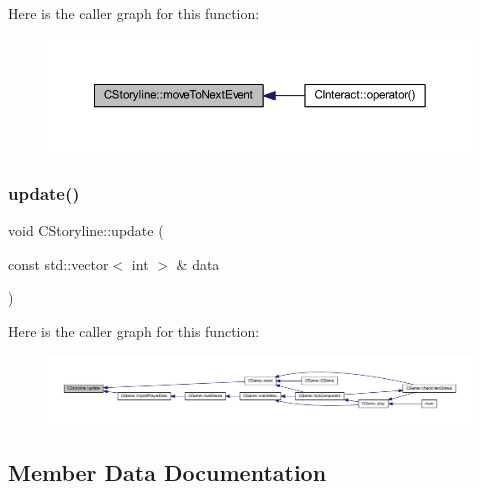 Here is the caller graph for this function\+:\nopagebreak
\begin{figure}[H]
\begin{center}
\leavevmode
\includegraphics[width=350pt]{class_c_storyline_aea8684dfbe5f41a4443616eb8f7b7560_icgraph}
\end{center}
\end{figure}
\mbox{\label{class_c_storyline_ad8c62b61513d498b53454aeaf621dda0}} 
\subsubsection{\texorpdfstring{update()}{update()}}
{\footnotesize\ttfamily void C\+Storyline\+::update (\begin{DoxyParamCaption}\item[{const std\+::vector$<$ int $>$ \&}]{data }\end{DoxyParamCaption})\hspace{0.3cm}{\ttfamily [inline]}}

Here is the caller graph for this function\+:\nopagebreak
\begin{figure}[H]
\begin{center}
\leavevmode
\includegraphics[width=350pt]{class_c_storyline_ad8c62b61513d498b53454aeaf621dda0_icgraph}
\end{center}
\end{figure}


\subsection{Member Data Documentation}
\mbox{\label{class_c_storyline_aafcf95c5c5983c6e1616f6f547ee5893}} 
